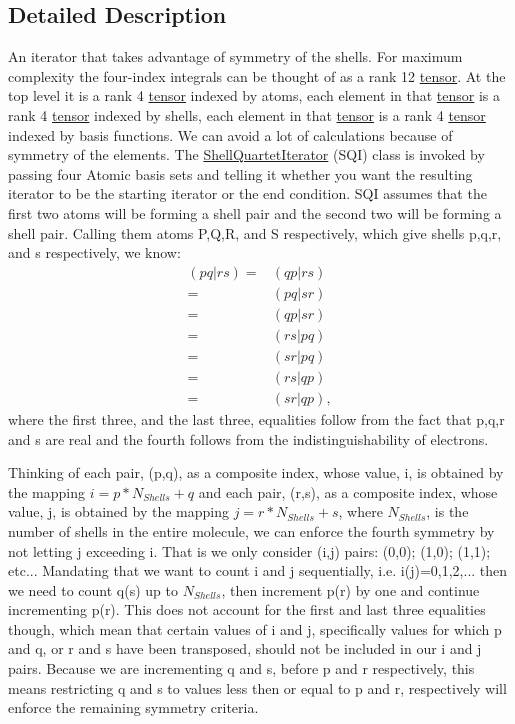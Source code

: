 \subsection{Detailed Description}
An iterator that takes advantage of symmetry of the shells. For maximum complexity the four-\/index integrals can be thought of as a rank 12 \hyperlink{classJKBuilder_1_1tensor}{tensor}. At the top level it is a rank 4 \hyperlink{classJKBuilder_1_1tensor}{tensor} indexed by atoms, each element in that \hyperlink{classJKBuilder_1_1tensor}{tensor} is a rank 4 \hyperlink{classJKBuilder_1_1tensor}{tensor} indexed by shells, each element in that \hyperlink{classJKBuilder_1_1tensor}{tensor} is a rank 4 \hyperlink{classJKBuilder_1_1tensor}{tensor} indexed by basis functions. We can avoid a lot of calculations because of symmetry of the elements. The \hyperlink{classJKBuilder_1_1ShellQuartetIterator}{ShellQuartetIterator} (SQI) class is invoked by passing four Atomic basis sets and telling it whether you want the resulting iterator to be the starting iterator or the end condition. SQI assumes that the first two atoms will be forming a shell pair and the second two will be forming a shell pair. Calling them atoms P,Q,R, and S respectively, which give shells p,q,r, and s respectively, we know: \begin{eqnarray*} \left(pq|rs\right)=&\left(qp|rs\right)\\ =&\left(pq|sr\right)\\ =&\left(qp|sr\right)\\ =&\left(rs|pq\right)\\ =&\left(sr|pq\right)\\ =&\left(rs|qp\right)\\ =&\left(sr|qp\right), \end{eqnarray*} where the first three, and the last three, equalities follow from the fact that p,q,r and s are real and the fourth follows from the indistinguishability of electrons.

Thinking of each pair, (p,q), as a composite index, whose value, i, is obtained by the mapping $i=p*N_{Shells}+q$ and each pair, (r,s), as a composite index, whose value, j, is obtained by the mapping $j=r*N_{Shells}+s$, where $N_{Shells}$, is the number of shells in the entire molecule, we can enforce the fourth symmetry by not letting j exceeding i. That is we only consider (i,j) pairs: (0,0); (1,0); (1,1); etc... Mandating that we want to count i and j sequentially, i.e. i(j)=0,1,2,... then we need to count q(s) up to $N_{Shells}$, then increment p(r) by one and continue incrementing p(r). This does not account for the first and last three equalities though, which mean that certain values of i and j, specifically values for which p and q, or r and s have been transposed, should not be included in our i and j pairs. Because we are incrementing q and s, before p and r respectively, this means restricting q and s to values less then or equal to p and r, respectively will enforce the remaining symmetry criteria.

